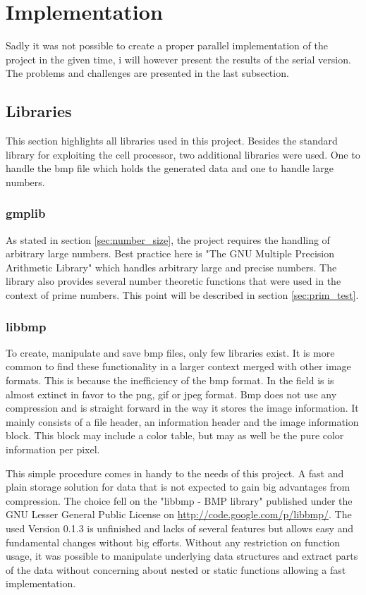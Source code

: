 \section{Implementation}
\label{sec:implementation}
Sadly it was not possible to create a proper parallel implementation of the project in the given time, i will however present the results of the serial version. The problems and challenges are presented in the last subsection.

\subsection{Libraries}
This section highlights all libraries used in this project. Besides the standard library for exploiting the cell processor, two additional libraries were used. One to handle the bmp file which holds the generated data and one to handle large numbers.

\subsubsection{gmplib}
As stated in section \ref{sec:number_size}, the project requires the handling of arbitrary large numbers. Best practice here is "The GNU Multiple Precision Arithmetic Library" which handles arbitrary large and precise numbers. The library also provides several number theoretic functions that were used in the context of prime numbers. This point will be described in section \ref{sec:prim_test}.

\subsubsection{libbmp}
To create, manipulate and save bmp files, only few libraries exist. It is more common to find these functionality in a larger context merged with other image formats. This is because the inefficiency of the bmp format. In the field is is almost extinct in favor to the png, gif or jpeg format. Bmp does not use any compression and is straight forward in the way it stores the image information. It mainly consists of a file header, an information header and the image information block. This block may include a color table, but may as well be the pure color information per pixel.

This simple procedure comes in handy to the needs of this project. A fast and plain storage solution for data that is not expected to gain big advantages from compression. The choice fell on the "libbmp - BMP library" published under the GNU Lesser General Public License on \url{http://code.google.com/p/libbmp/}. The used Version 0.1.3 is unfinished and lacks of several features but allows easy and fundamental changes without big efforts. Without any restriction on function usage, it was possible to manipulate underlying data structures and extract parts of the data without concerning about nested or static functions allowing a fast implementation.

